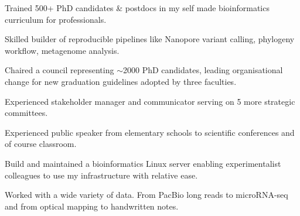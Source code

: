 \documentclass[a4paper,10pt]{article}
\begin{document}
{\begin{adjustbox}{valign=t}
\begin{minipage}[t]{0.6\textwidth}
\begin{description}
  \item Trained 500+ PhD candidates \& postdocs in my self made bioinformatics curriculum for professionals.
  \item Skilled builder of reproducible pipelines like Nanopore variant calling, phylogeny workflow, metagenome analysis.
  \item Chaired a council representing $\sim$2000 PhD candidates, leading organisational change for new graduation guidelines adopted by three faculties.
  \item Experienced stakeholder manager and communicator serving on 5 more strategic committees.
  \item Experienced public speaker from elementary schools to scientific conferences and of course classroom.
  \item Build and maintained a bioinformatics Linux server enabling experimentalist colleagues to use my infrastructure with relative ease.
  \item Worked with a wide variety of data. From PacBio long reads to microRNA-seq and from optical mapping to handwritten notes.
\end{description}

\end{minipage}%
\end{adjustbox}%
}
\newpage
\end{document}

